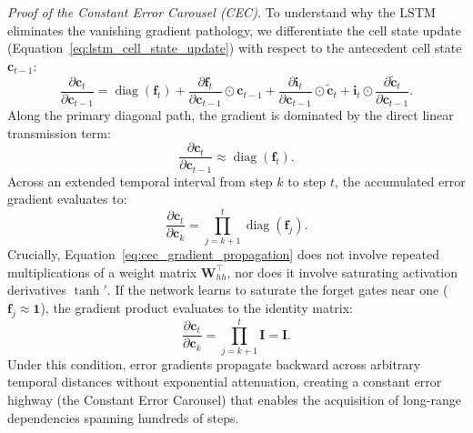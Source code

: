 \documentclass[../../main.tex]{subfiles}
\begin{document}
\textit{Proof of the Constant Error Carousel (CEC).} To understand why the LSTM eliminates the vanishing gradient pathology, we differentiate the cell state update (Equation~\ref{eq:lstm_cell_state_update}) with respect to the antecedent cell state $\mathbf{c}_{t-1}$:
\begin{equation}
\frac{\partial \mathbf{c}_t}{\partial \mathbf{c}_{t-1}} = \operatorname{diag}\left(\mathbf{f}_t\right) + \frac{\partial \mathbf{f}_t}{\partial \mathbf{c}_{t-1}} \odot \mathbf{c}_{t-1} + \frac{\partial \mathbf{i}_t}{\partial \mathbf{c}_{t-1}} \odot \tilde{\mathbf{c}}_t + \mathbf{i}_t \odot \frac{\partial \tilde{\mathbf{c}}_t}{\partial \mathbf{c}_{t-1}}.
\end{equation}
Along the primary diagonal path, the gradient is dominated by the direct linear transmission term:
\begin{equation}
\frac{\partial \mathbf{c}_t}{\partial \mathbf{c}_{t-1}} \approx \operatorname{diag}\left(\mathbf{f}_t\right).
\end{equation}
Across an extended temporal interval from step $k$ to step $t$, the accumulated error gradient evaluates to:
\begin{equation}
\frac{\partial \mathbf{c}_t}{\partial \mathbf{c}_k} = \prod_{j=k+1}^t \operatorname{diag}\left(\mathbf{f}_j\right).
\label{eq:cec_gradient_propagation}
\end{equation}
Crucially, Equation~\ref{eq:cec_gradient_propagation} does not involve repeated multiplications of a weight matrix $\mathbf{W}_{hh}^\top$, nor does it involve saturating activation derivatives $\tanh'$. If the network learns to saturate the forget gates near one ($\mathbf{f}_j \approx \mathbf{1}$), the gradient product evaluates to the identity matrix:
\begin{equation}
\frac{\partial \mathbf{c}_t}{\partial \mathbf{c}_k} = \prod_{j=k+1}^t \mathbf{I} = \mathbf{I}.
\end{equation}
Under this condition, error gradients propagate backward across arbitrary temporal distances without exponential attenuation, creating a constant error highway (the Constant Error Carousel) that enables the acquisition of long-range dependencies spanning hundreds of steps.
\end{document}
